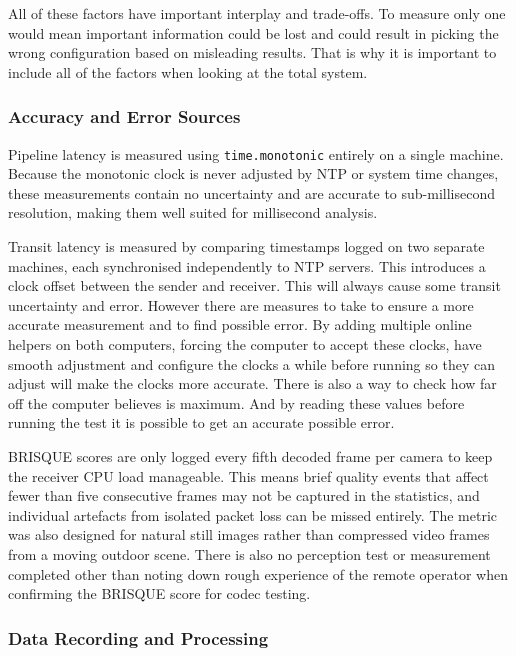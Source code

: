 All of these factors have important interplay and trade-offs. To measure only one would mean important information could be lost and could result in picking the wrong configuration based on misleading results. That is why it is important to include all of the factors when looking at the total system.

\subsubsection{Accuracy and Error Sources}

Pipeline latency is measured using \texttt{time.monotonic} entirely on a single machine. Because the monotonic clock is never adjusted by NTP or system time changes, these measurements contain no uncertainty and are accurate to sub-millisecond resolution, making them well suited for millisecond analysis.

Transit latency is measured by comparing timestamps logged on two separate machines, each synchronised independently to NTP servers. This introduces a clock offset between the sender and receiver. This will always cause some transit uncertainty and error. However there are measures to take to ensure a more accurate measurement and to find possible error. By adding multiple online helpers on both computers, forcing the computer to accept these clocks, have smooth adjustment and configure the clocks a while before running so they can adjust will make the clocks more accurate. There is also a way to check how far off the computer believes is maximum. And by reading these values before running the test it is possible to get an accurate possible error.

BRISQUE scores are only logged every fifth decoded frame per camera to keep the receiver CPU load manageable. This means brief quality events that affect fewer than five consecutive frames may not be captured in the statistics, and individual artefacts from isolated packet loss can be missed entirely. The metric was also designed for natural still images rather than compressed video frames from a moving outdoor scene. There is also no perception test or measurement completed other than noting down rough experience of the remote operator when confirming the BRISQUE score for codec testing.

\subsubsection{Data Recording and Processing}

